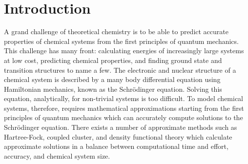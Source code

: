 
\section{Introduction}
	A grand challenge of theoretical chemistry is to be able to predict accurate properties of chemical systems from the first principles of quantum mechanics. This challenge has many front:  calculating energies of increasingly large systems at low cost, predicting chemical properties, and finding ground state and transition structures to name a few. The electronic and nuclear structure of a chemical system is described by a many body differential equation using Hamiltonian mechanics, known as the Schr{\"o}dinger equation.  Solving this equation, analytically, for non-trivial systems is too difficult. To model chemical systems, therefore, requires mathematical approximations starting from the first principles of quantum mechanics which can accurately compute solutions to the Schr{\"o}dinger equation.  There exists a number of approximate methods such as Hartree-Fock, coupled cluster, and density functional theory which calculate approximate solutions in a balance between computational time and effort, accuracy, and chemical system size.

